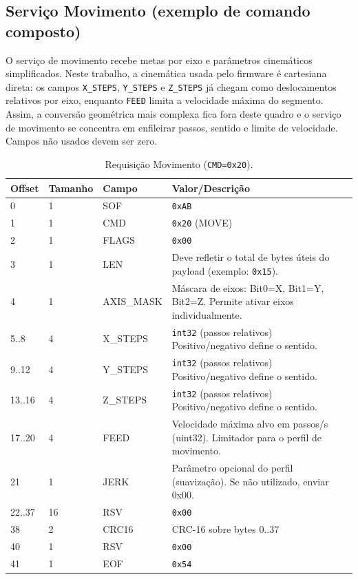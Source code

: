 \subsection*{Serviço Movimento (exemplo de comando composto)}

O serviço de movimento recebe metas por eixo e parâmetros cinemáticos
simplificados. Neste trabalho, a cinemática usada pelo firmware é
cartesiana direta: os campos \texttt{X\_STEPS}, \texttt{Y\_STEPS} e
\texttt{Z\_STEPS} já chegam como deslocamentos relativos por eixo, enquanto
\texttt{FEED} limita a velocidade máxima do segmento. Assim, a conversão
geométrica mais complexa fica fora deste quadro e o serviço de movimento
se concentra em enfileirar passos, sentido e limite de velocidade. Campos
não usados devem ser zero.

\begin{table}[H]
  \centering
  \caption{Requisição Movimento (\texttt{CMD=0x20}).}
  \label{tab:spi-move-req}
  \setlength{\tabcolsep}{4pt}\footnotesize
  \begin{tabularx}{\textwidth}{lllX}
    \toprule
    Offset & Tamanho & Campo & Valor/Descrição \\
    \midrule
    0 & 1 & SOF & \texttt{0xAB} \\
    1 & 1 & CMD & \texttt{0x20} (MOVE) \\
    2 & 1 & FLAGS & \texttt{0x00} \\
    3 & 1 & LEN & Deve refletir o total de bytes úteis do payload (exemplo: \texttt{0x15}). \\
    4 & 1 & AXIS\_MASK & M\'ascara de eixos: Bit0=X, Bit1=Y, Bit2=Z. Permite ativar eixos individualmente. \\
    5..8 & 4 & X\_STEPS & \texttt{int32} (passos relativos) Positivo/negativo define o sentido. \\
    9..12 & 4 & Y\_STEPS & \texttt{int32} (passos relativos)  Positivo/negativo define o sentido.\\
    13..16 & 4 & Z\_STEPS & \texttt{int32} (passos relativos) Positivo/negativo define o sentido. \\
    17..20 & 4 & FEED & Velocidade m\'axima alvo em passos/s (uint32). Limitador para o perfil de movimento. \\
    21 & 1 & JERK & Par\^ametro opcional do perfil (suaviza\c{c}\~ao). Se n\~ao utilizado, enviar 0x00.  \\
    22..37 & 16 & RSV & \texttt{0x00} \\
    38 & 2 & CRC16 & CRC-16 sobre bytes 0..37 \\
    40 & 1 & RSV & \texttt{0x00} \\
    41 & 1 & EOF & \texttt{0x54} \\
    \bottomrule
  \end{tabularx}
\end{table}

